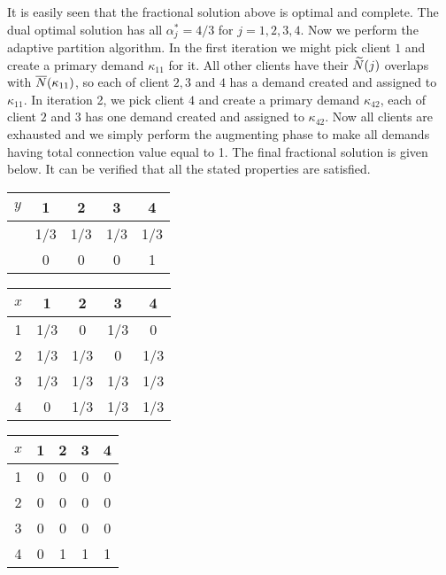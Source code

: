 \documentclass{article}
\begin{document}
It is easily seen that the fractional solution above is optimal and
complete. The dual optimal solution has all $\alpha_j^\ast = 4/3$ for
$j=1,2,3,4$. Now we perform the adaptive partition algorithm. In the
first iteration we might pick client $1$ and create a primary demand
$\kappa_{11}$ for it. All other clients have their ${\widetilde N}(j)$
overlaps with ${\overline{N}}(\kappa_{11})$, so each of client $2,3$ and $4$
has a demand created and assigned to $\kappa_{11}$. In iteration 2, we
pick client $4$ and create a primary demand $\kappa_{42}$, each of
client $2$ and $3$ has one demand created and assigned to
$\kappa_{42}$. Now all clients are exhausted and we simply perform the
augmenting phase to make all demands having total connection value
equal to 1. The final fractional solution is given below. It can be
verified that all the stated properties are satisfied.
\begin{table}[ht,center]
  \begin{subtable}{0.3\textwidth}
  \centering
  \begin{tabular}{c | c c c c}
    $y$ & 1 & 2 & 3 & 4\\
    \hline
    & 1/3 & 1/3 & 1/3 & 1/3\\
    & 0 & 0 & 0 & 1\\
  \end{tabular}
\end{subtable}
%
\begin{subtable}{0.3\textwidth}
  \centering
  \begin{tabular}{c | c c c c}
    $x$ & 1 & 2 & 3 & 4\\
    \hline
    1 & 1/3 & 0   & 1/3 & 0\\
    2 & 1/3 & 1/3 & 0   & 1/3\\
    3 & 1/3 & 1/3 & 1/3 & 1/3\\
    4 & 0   & 1/3 & 1/3 & 1/3\\
  \end{tabular}
\end{subtable}
%
\begin{subtable}{0.3\textwidth}
  \centering
  \begin{tabular}{c | c c c c}
    $x$ & 1 & 2 & 3 & 4\\
    \hline
    1 & 0 & 0 & 0 & 0\\
    2 & 0 & 0 & 0 & 0\\
    3 & 0 & 0 & 0 & 0\\
    4 & 0 & 1 & 1 & 1\\
  \end{tabular}
\end{subtable}
\end{table}
\end{document}
